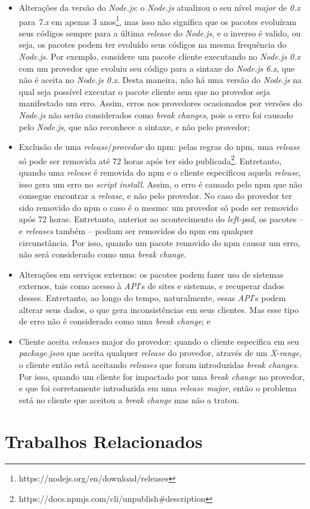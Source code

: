 \begin{itemize}
    \item Alterações da versão do \textit{Node.js}: o \textit{Node.js} atualizou o seu nível \textit{major} de \textit{0.x} para \textit{7.x} em apenas 3 anos\footnote{https://nodejs.org/en/download/releases}, mas isso não significa que os pacotes evoluíram seus códigos sempre para a última \textit{release} do \textit{Node.js}, e o inverso é valido, ou seja, os pacotes podem ter evoluído seus códigos na mesma frequência do \textit{Node.js}. Por exemplo, considere um pacote cliente executando no \textit{Node.js 0.x} com um provedor que evoluiu seu código para a sintaxe do \textit{Node.js 6.x}, que não é aceita no \textit{Node.js 0.x}. Desta maneira, não há uma versão do \textit{Node.js}  na qual seja possível executar o pacote cliente sem que no provedor seja manifestado um erro. Assim, erros nos provedores ocasionados por versões do \textit{Node.js} não serão considerados como \textit{break changes}, pois o erro foi causado pelo \textit{Node.js}, que não reconhece a sintaxe, e não pelo provedor;
    \item Exclusão de uma \textit{release}/\textit{provedor} do \gls{npm}: pelas regras do \gls{npm}, uma \textit{release} só pode ser removida até 72 horas após ter sido publicada\footnote{https://docs.npmjs.com/cli/unpublish\#description}. Entretanto, quando uma \textit{release} é removida do \gls{npm} e o cliente especificou aquela \textit{release}, isso gera um erro no \textit{script install}. Assim, o erro é causado pelo \gls{npm} que não consegue encontrar a \textit{release}, e não pelo provedor. No caso do provedor ter sido removido do \gls{npm} o caso é o mesmo: um provedor só pode ser removido após 72 horas. Entretanto, anterior ao acontecimento do \textit{left-pad}, os pacotes -- e \textit{releases} também -- podiam ser removidos do \gls{npm} em qualquer circunstância. Por isso, quando um pacote removido do \gls{npm} causar um erro, não será considerado como uma \textit{break change}.
    \item Alterações em serviços externos: os pacotes podem fazer uso de sistemas externos, tais como acesso à \textit{API}'s de sites e sistemas, e recuperar dados desses. Entretanto, ao longo do tempo, naturalmente, essas \textit{API}'s podem alterar seus dados, o que gera inconsistências em seus clientes. Mas esse tipo de erro não é considerado como uma \textit{break change}; e
    \item Cliente aceita \textit{releases} major do provedor: quando o cliente especifica em seu \textit{package.json} que aceita qualquer \textit{release} do provedor, através de um \textit{X-range}, o cliente então está aceitando \textit{releases} que foram introduzidas \textit{break changes}. Por isso, quando um cliente for impactado por uma \textit{break change} no provedor, e que foi corretamente introduzida em uma \textit{release major}, então o problema está no cliente que aceitou a \textit{break change} mas não a tratou.
\end{itemize}{}

\section{Trabalhos Relacionados}
\label{sec:related_works}